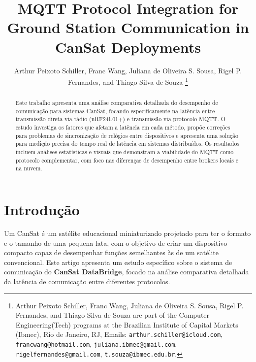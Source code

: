 \documentclass[hidelinks]{sbrt}
\begin{document}
\title{MQTT Protocol Integration for Ground Station Communication in CanSat Deployments}

\author{Arthur Peixoto Schiller, Franc Wang, Juliana de Oliveira S. Sousa, Rigel P. Fernandes, and Thiago Silva de Souza
\thanks{Arthur Peixoto Schiller, Franc Wang, Juliana de Oliveira S. Sousa, Rigel P. Fernandes, and Thiago Silva de Souza are part of the Computer Engineering(Tech) programs at the Brazilian Institute of Capital Markets (Ibmec), Rio de Janeiro, RJ, Emails: 
{\tt arthur.schiller@icloud.com},
{\tt francwang@hotmail.com},
{\tt juliana.ibmec@gmail.com},
{\tt rigelfernandes@gmail.com},
{\tt t.souza@ibmec.edu.br}.}
}

\maketitle


\begin{abstract}
Este trabalho apresenta uma análise comparativa detalhada do desempenho de comunicação para sistemas CanSat, focando especificamente na latência entre transmissão direta via rádio (nRF24L01+) e transmissão via protocolo MQTT. O estudo investiga os fatores que afetam a latência em cada método, propõe correções para problemas de sincronização de relógios entre dispositivos e apresenta uma solução para medição precisa do tempo real de latência em sistemas distribuídos. Os resultados incluem análises estatísticas e visuais que demonstram a viabilidade do MQTT como protocolo complementar, com foco nas diferenças de desempenho entre brokers locais e na nuvem.
\end{abstract}

\section{Introdução}

Um CanSat é um satélite educacional miniaturizado projetado para ter o formato e o tamanho de uma pequena lata, com o objetivo de criar um dispositivo compacto capaz de desempenhar funções semelhantes às de um satélite convencional. Este artigo apresenta um estudo específico sobre o sistema de comunicação do \textbf{CanSat DataBridge}, focado na análise comparativa detalhada da latência de comunicação entre diferentes protocolos.
\end{document}
